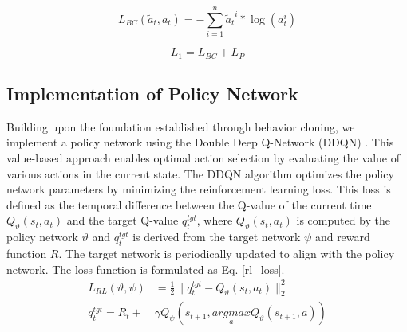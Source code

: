 \documentclass[lettersize,journal]{IEEEtran}
\begin{document}
\begin{equation}
L_{BC}\left(\tilde{a}_t,{{a}}_t\right)=-\sum_{i=1}^{n}{{\tilde{a}_t}^i\ast\log{\left({{a}}_t^i\right)}}
\label{bc_loss}
\end{equation}

\begin{equation}
L_{1}=L_{BC}+L_P
\label{loss1}
\end{equation}

\subsection{Implementation of Policy Network}
Building upon the foundation established through behavior cloning, we implement a policy network using the Double Deep Q-Network (DDQN) \cite{deep2016}. 
This value-based approach enables optimal action selection by evaluating the value of various actions in the current state.
The DDQN algorithm optimizes the policy network parameters by minimizing the reinforcement learning loss. This loss is defined as the temporal difference between the Q-value of the current time $Q_{\vartheta}(s_t, a_t)$ and the target Q-value $q_t^{tgt}$, where $Q_{\vartheta}(s_t, a_t)$ is computed by the policy network $\vartheta$ and $q_t^{tgt}$ is derived from the target network $\psi$ and reward function $R$. The target network is periodically updated to align with the policy network. The loss function is formulated as Eq. \ref{rl_loss}.
\begin{equation}
    \begin{aligned}
        L_{RL}\left( \vartheta ,\psi \right) &=\frac{1}{2}\lVert q_{t}^{tgt}-Q_{\vartheta}\left( s_t,a_t \right) \rVert _{2}^{2}\\
        q_{t}^{tgt}=R_t +&\gamma Q_{\psi}\left( s_{t+1},\underset{a}{argmax}Q_{\vartheta}\left( s_{t+1},a \right) \right)
    \end{aligned}
    \label{rl_loss}
\end{equation}
\end{document}
